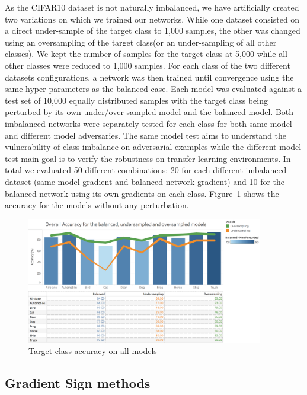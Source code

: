 \documentclass[runningheads,a4paper]{llncs}
\begin{document}
As the CIFAR10 dataset is not naturally imbalanced, we have artificially created two variations on which we trained our networks.  While one dataset consisted on a direct under-sample of the target class to 1,000 samples, the other was changed using  an oversampling of the target class(or an under-sampling of all other classes). We kept the number of samples for the target class at 5,000 while all other classes were reduced to 1,000 samples. For each class of the two different datasets configurations, a network was then trained until convergence using the same hyper-parameters as the balanced case. Each model was evaluated against a test set of 10,000 equally distributed samples with the target class being perturbed by its own under/over-sampled model and the balanced model. Both imbalanced networks were separately tested for each class for both same model and different model adversaries. The same model test aims to understand the vulnerability of class imbalance on adversarial examples while the different model test main goal is to verify the robustness on transfer learning environments. In total we evaluated 50 different combinations: 20 for each different imbalanced dataset (same model gradient and balanced network gradient) and 10 for the balanced network using its own gradients on each class. Figure~\ref{fig:acc_graph} shows the accuracy for the models without any perturbation.
\begin{figure}
	\centering
	\includegraphics[height=5.5cm]{graph_non_pert.png}
	\caption{Target class accuracy on all models}
	\label{fig:acc_graph}
\end{figure}



\subsection{Gradient Sign methods}
\end{document}
